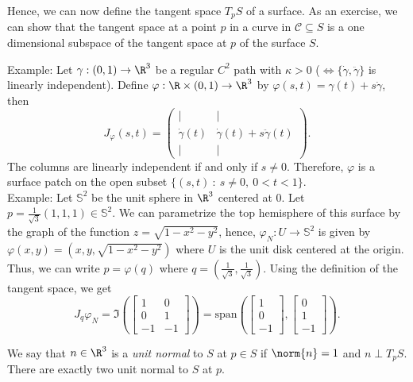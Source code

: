 Hence, we can now define the tangent space $T_p S$ of a surface. As an exercise, we can show that the tangent space at a point $p$ in a curve in $\mathcal{C} \subseteq S$ is a one dimensional subspace of the tangent space at $p$ of the surface $S$.

Example: Let $\gamma : (0,1) \to \R^3$ be a regular $C^2$ path with $\kappa > 0$ ($\iff \{\dot{\gamma}, \ddot{\gamma}\}$ is linearly independent). Define $\varphi : \R \times (0,1) \to \R^3$ by $\varphi(s,t) = \gamma(t) + s\dot{\gamma}$, then
$$J_{\varphi}(s,t) = \begin{pmatrix}
    | & | \\
    \dot{\gamma}(t) & \dot{\gamma}(t) + s\ddot{\gamma}(t) \\
    | & |
\end{pmatrix}.$$
The columns are linearly independent if and only if $s \neq 0$. Therefore, $\varphi$ is a surface patch on the open subset $\{(s,t) \ : \ s\neq 0, \ 0 < t < 1\}$. \\

Example: Let $\mathbb{S}^2$ be the unit sphere in $\R^3$ centered at 0. Let $p = \frac{1}{\sqrt{3}}(1,1,1) \in \mathbb{S}^2$. We can parametrize the top hemisphere of this surface by the graph of the function $z = \sqrt{1 - x^2 - y^2}$, hence, $\varphi_N : U \to \mathbb{S}^2$ is given by $\varphi(x,y) = (x,y, \sqrt{1 - x^2 - y^2})$ where $U$ is the unit disk centered at the origin. Thus, we can write $p = \varphi(q)$ where $q = (\frac{1}{\sqrt{3}}, \frac{1}{\sqrt{3}})$. Using the definition of the tangent space, we get
$$J_q \varphi_N = \Im\left( \begin{bmatrix}
    1 & 0 \\ 0 & 1 \\ -1 & -1
\end{bmatrix}\right) = \text{span}\left(\begin{bmatrix} 1 \\ 0 \\ - 1\end{bmatrix}, \begin{bmatrix} 0 \\ 1 \\ - 1\end{bmatrix}\right).$$

\begin{definition}
    We say that $n \in \R^3$ is a \textit{unit normal }to $S$ at $p \in S$ if $\norm{n} = 1$ and $n \perp T_p S$. There are exactly two unit normal to $S$ at $p$.
\end{definition}

